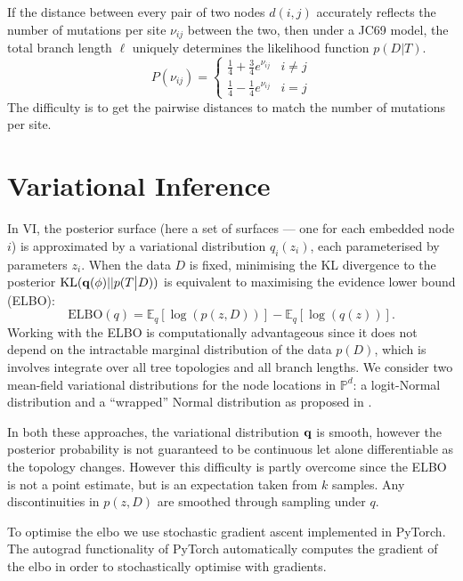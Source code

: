 \documentclass[11pt]{article}
\newcommand{\be}{\begin{equation*}}
\newcommand{\ee}{\end{equation*}}
\newcommand{\bee}{\begin{eqnarray*}}
\newcommand{\eee}{\end{eqnarray*}}
\begin{document}
If the distance between every pair of two nodes $d(i,j)$ accurately reflects the number of mutations per site $\nu_{ij}$ between the two, then under a JC69 model, the total branch length $\ell$ uniquely determines the likelihood function $p(D|T)$.
\[
P(\nu_{ij}) = 
\begin{cases}
	\frac{1}{4} + \frac{3}{4} e^{\nu_{ij}} & i \neq j\\
	\frac{1}{4} - \frac{1}{4} e^{\nu_{ij}} & i = j
\end{cases}
\]
The difficulty is to get the pairwise distances to match the number of mutations per site.

\section{Variational Inference}
In VI, the posterior surface (here a set of surfaces --- one for each embedded node $i$) is approximated by a variational distribution $q_{i}(z_{i})$, each parameterised by parameters $z_{i}$.
When the data $D$ is fixed, minimising the KL divergence to the posterior $\text{KL}({\bf q}(\phi)||p(T\big|D))$ is equivalent to maximising the evidence lower bound (ELBO):
\be
\text{ELBO}(q) = \mathbb{E}_{q}[\log(p(z,D))] - \mathbb{E}_{q}[\log(q(z))].
\ee
Working with the ELBO is computationally advantageous since it does not depend on the intractable marginal distribution of the data $p(D)$, which is involves integrate over all tree topologies and all branch lengths.
We consider two mean-field variational distributions for the node locations in $\mathbb{P}^{d}$: a logit-Normal distribution and a ``wrapped'' Normal distribution as proposed in \cite{Nagano2019Wrapped}.

In both these approaches, the variational distribution $\bold{q}$ is smooth, however the posterior probability is not guaranteed to be continuous let alone differentiable as the topology changes.
However this difficulty is partly overcome since the ELBO is not a point estimate, but is an expectation taken from $k$ samples.
Any discontinuities in $p(z,D)$ are smoothed through sampling under $q$.

To optimise the elbo we use stochastic gradient ascent implemented in PyTorch.
The autograd functionality of PyTorch automatically computes the gradient of the elbo in order to stochastically optimise with gradients.
\end{document}
